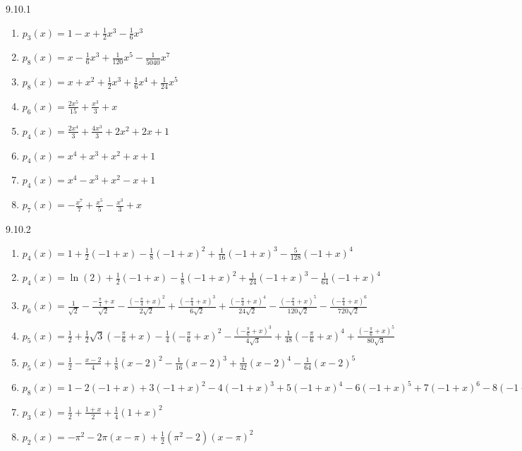 \begin{Answer}{9.10.1}
\begin{enumerate}
\item
{$p_3(x) = 1-x+\frac12x^3-\frac16x^3$
}
\item
{$p_8(x) = x-\frac16x^3+\frac1{120}x^5-\frac1{5040}x^7$
}
\item
{$p_8(x) = x+x^2+\frac12x^3+\frac16x^4+\frac1{24}x^5$
}
\item
{$p_6(x) = \frac{2 x^5}{15}+\frac{x^3}{3}+x$
}
\item
{$p_4(x) = \frac{2 x^4}{3}+\frac{4 x^3}{3}+2 x^2+2 x+1$
}
\item
{$p_4(x) = x^4+x^3+x^2+x+1$
}
\item
{$p_4(x) = x^4-x^3+x^2-x+1$
}
\item
{$p_7(x) = -\frac{x^7}{7}+\frac{x^5}{5}-\frac{x^3}{3}+x$
}
\end{enumerate}
\end{Answer}
\begin{Answer}{9.10.2}
\begin{enumerate}
\item
{$p_4(x) = 1+\frac{1}{2} (-1+x)-\frac{1}{8} (-1+x)^2+\frac{1}{16}
   (-1+x)^3-\frac{5}{128} (-1+x)^4$
}
\item
{$p_4(x) = \ln (2)+\frac{1}{2} (-1+x)-\frac{1}{8}
   (-1+x)^2+\frac{1}{24} (-1+x)^3-\frac{1}{64} (-1+x)^4$
}
\item
{$p_6(x) = \frac{1}{\sqrt{2}}-\frac{-\frac{\pi
   }{4}+x}{\sqrt{2}}-\frac{\left(-\frac{\pi
   }{4}+x\right)^2}{2 \sqrt{2}}+\frac{\left(-\frac{\pi
   }{4}+x\right)^3}{6 \sqrt{2}}+\frac{\left(-\frac{\pi
   }{4}+x\right)^4}{24 \sqrt{2}}-\frac{\left(-\frac{\pi
   }{4}+x\right)^5}{120 \sqrt{2}}-\frac{\left(-\frac{\pi
   }{4}+x\right)^6}{720 \sqrt{2}}$
}
\item
{$p_5(x) = \frac{1}{2}+\frac{1}{2} \sqrt{3} \left(-\frac{\pi
   }{6}+x\right)-\frac{1}{4} \left(-\frac{\pi
   }{6}+x\right)^2-\frac{\left(-\frac{\pi }{6}+x\right)^3}{4
   \sqrt{3}}+\frac{1}{48} \left(-\frac{\pi
   }{6}+x\right)^4+\frac{\left(-\frac{\pi
   }{6}+x\right)^5}{80 \sqrt{3}}$
}
\item
{$p_5(x) = \frac{1}{2}-\frac{x-2}{4}+\frac{1}{8} (x-2)^2-\frac{1}{16}
   (x-2)^3+\frac{1}{32} (x-2)^4-\frac{1}{64} (x-2)^5$
}
\item
{$p_8(x) = 1-2 (-1+x)+3 (-1+x)^2-4 (-1+x)^3+5 (-1+x)^4-6 (-1+x)^5+7
   (-1+x)^6-8 (-1+x)^7+9 (-1+x)^8$
}
\item
{$p_3(x) =\frac{1}{2}+\frac{1+x}{2}+\frac{1}{4} (1+x)^2$
}
\item
{$p_2(x) =-\pi ^2-2 \pi  (x-\pi)+\frac{1}{2} \left(\pi ^2-2\right)
   (x-\pi)^2$
}
\end{enumerate}
\end{Answer}
